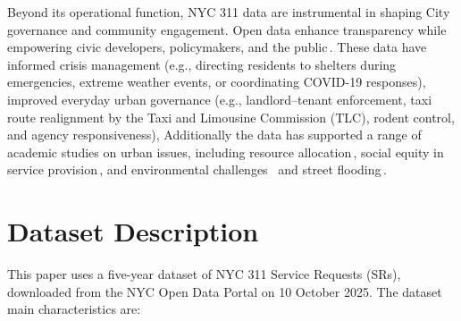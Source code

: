 \documentclass[linenumber]{jdsart}
\begin{document}
Beyond its operational function, \textsc{NYC 311} data are
instrumental in shaping City governance and community engagement. 
Open data enhance transparency while empowering civic developers, 
policymakers, and the public\,\citep{minkoff2016nyc,o2017uncharted,kontokosta2021bias}. 
These data have informed crisis management 
(e.g., directing residents to shelters during emergencies, extreme weather events,
 or coordinating COVID-19 responses), improved everyday urban governance 
(e.g., landlord--tenant enforcement, taxi route realignment by the 
Taxi and Limousine Commission (TLC), rodent control, and agency responsiveness), 
Additionally the data has supported a range of academic studies on urban issues, 
including resource allocation\,\citep{zha2014profiling,raj2021swift}, 
social equity in service provision\,\citep{white2018promises,kontokosta2021bias}, 
and environmental challenges \,\citep{dove2022sounds} 
and street flooding\,\citep{agonafir2022understanding}.


\section{Dataset Description} 
\label{sec:data}
This paper uses a five-year dataset of NYC 311 Service Requests (SRs), 
downloaded from the NYC Open Data Portal on 10 October 2025. 
The dataset main characteristics are:
\end{document}
